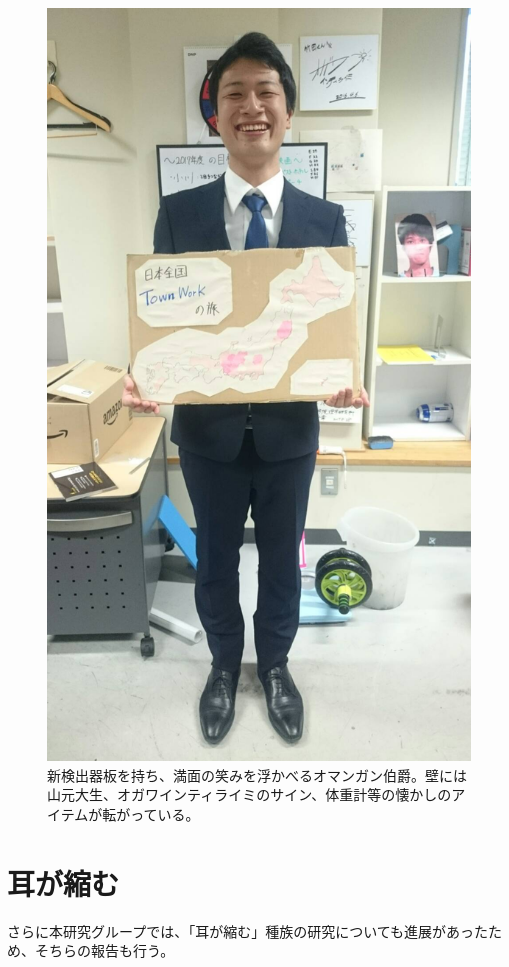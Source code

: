 \documentclass[12pt]{jsarticle}
\begin{document}
\begin{figure}
\centering
\includegraphics[scale=0.18]{figure/TWBoard}
\caption{新検出器板を持ち、満面の笑みを浮かべるオマンガン伯爵。壁には山元大生、オガワインティライミのサイン、体重計等の懐かしのアイテムが転がっている。}
\label{oyayubi}
\end{figure}

\newpage
\clearpage
\section{耳が縮む}
さらに本研究グループでは、「耳が縮む」種族の研究についても進展があったため、そちらの報告も行う。
\end{document}
